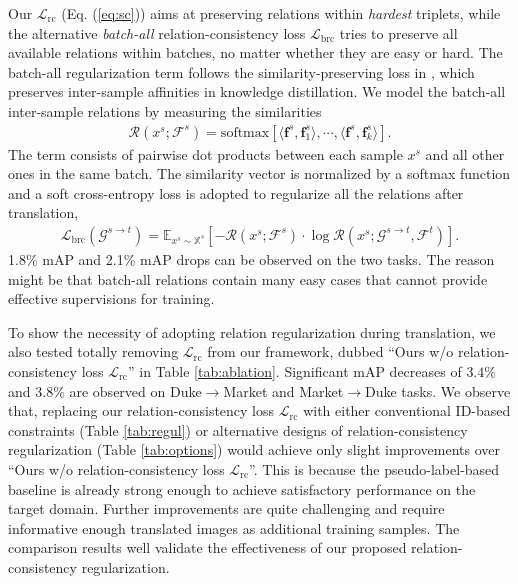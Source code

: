 \documentclass[journal]{IEEEtran}
\def\vf{{\bm{f}}}
\def\sX{{\mathbb{X}}}
\begin{document}
Our $\mathcal{L}_\text{rc}$ (Eq. (\ref{eq:sc})) aims at preserving relations within \textit{hardest} triplets,
while the alternative \textit{batch-all} relation-consistency loss  $\mathcal{L}_\text{brc}$ tries to preserve all available relations within batches, no matter whether they are easy or hard.
 {The batch-all regularization term follows the similarity-preserving loss in \cite{tung2019similarity}, which preserves inter-sample affinities in knowledge distillation.}
We model the batch-all inter-sample relations by measuring
the similarities
\begin{align}
\mathcal{R}(x^s;\mathcal{F}^s)= {\text{softmax}}[\langle \vf^s, \vf_1^s \rangle,\cdots,\langle \vf^s, \vf_k^s \rangle]. \nonumber
\end{align}
The term consists of pairwise dot products between each sample $x^s$ and all other ones in the same batch.
The similarity vector is normalized by a softmax function and a soft cross-entropy loss is adopted to regularize all the relations after translation,
\begin{align}
\mathcal{L}_\text{brc}(\mathcal{G}^{s\to t})=\mathbb{E}_{x^s\sim \sX^s} [ - \mathcal{R}(x^s; \mathcal{F}^s) \cdot \log \mathcal{R}(x^s; \mathcal{G}^{s \to t}, \mathcal{F}^t) ]. \nonumber
\end{align}
1.8\% mAP and 2.1\% mAP drops can be observed on the two tasks.
The reason might be that
batch-all relations contain many easy cases that cannot provide effective supervisions for training.


To show the necessity of adopting relation regularization during translation, we also tested totally removing $\mathcal{L}_\text{rc}$ from our framework, dubbed ``Ours w/o relation-consistency loss $\mathcal{L}_\text{rc}$'' in Table \ref{tab:ablation}.
Significant mAP decreases of $3.4\%$ and $3.8\%$ are observed on Duke$\to$Market and Market$\to$Duke tasks.
 {We observe that,  replacing our relation-consistency loss $\mathcal{L}_\text{rc}$ with either conventional ID-based constraints (Table \ref{tab:regul}) or alternative designs of relation-consistency regularization (Table \ref{tab:options}) would achieve only slight improvements over ``Ours w/o relation-consistency loss $\mathcal{L}_\text{rc}$''.  This is because the pseudo-label-based baseline is already strong enough to achieve satisfactory performance on the target domain. Further improvements are quite
challenging and require informative enough translated images as additional training samples. The comparison results well validate the effectiveness of our proposed relation-consistency regularization.}
\end{document}
